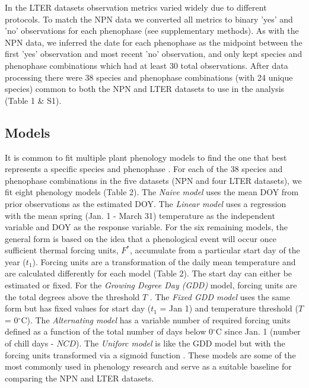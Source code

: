 \documentclass[fleqn,12pt,lineno]{article}
\begin{document}
In the LTER datasets observation metrics varied widely due to different protocols. To match the NPN data we converted all metrics to binary 'yes' and 'no' observations for each phenophase (see supplementary methods). As with the NPN data, we inferred the date for each phenophase as the midpoint between the first 'yes' observation and most recent 'no' observation, and only kept species and phenophase combinations which had at least 30 total observations. After data processing there were 38 species and phenophase combinations (with 24 unique species) common to both the NPN and LTER datasets to use in the analysis (Table 1 \& S1).

\subsection*{Models}

It is common to fit multiple plant phenology models to find the one that best represents a specific species and phenophase \citep{chuine2013}. For each of the 38 species and phenophase combinations in the five datasets (NPN and four LTER datasets), we fit eight phenology models (Table 2). The \textit{Naive model} uses the mean DOY from prior observations as the estimated DOY. The \textit{Linear model} uses a regression with the mean spring (Jan. 1 - March 31) temperature as the independent variable and DOY as the response variable. For the six remaining models, the general form is based on the idea that a phenological event will occur once sufficient thermal forcing units, $F^{*}$, accumulate from a particular start day of the year ($t_{1}$). Forcing units are a transformation of the daily mean temperature and are calculated differently for each model (Table 2). The start day can either be estimated or fixed. For the \textit{Growing Degree Day (GDD)} model, forcing units are the total degrees above the threshold $T$ \citep{reaumur1735, wang1960, hunter1992}. The \textit{Fixed GDD model} uses the same form but has fixed values for start day ($t_{1}$ = Jan 1) and temperature threshold ($T$ = 0$^{\circ}$C). The \textit{Alternating model} has a variable number of required forcing units defined as a function of the total number of days below 0$^{\circ}$C since Jan. 1 (number of chill days - $NCD$). The \textit{Uniforc model} is like the GDD model but with the forcing units transformed via a sigmoid function \citep{chuine2000}. These models are some of the most commonly used in phenology research and serve as a suitable baseline for comparing the NPN and LTER datasets.
\end{document}

